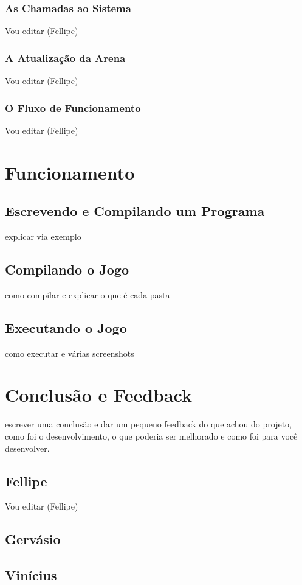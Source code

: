 \documentclass[a4paper]{article}
\begin{document}

\subsubsection{As Chamadas ao Sistema}
Vou editar (Fellipe)
\subsubsection{A Atualização da Arena}
Vou editar (Fellipe)
\subsubsection{O Fluxo de Funcionamento}
Vou editar (Fellipe)

\section{Funcionamento}
\subsection{Escrevendo e Compilando um Programa}
explicar via exemplo
\subsection{Compilando o Jogo}
como compilar e explicar o que é cada pasta
\subsection{Executando o Jogo}
como executar e várias screenshots

\section{Conclusão e Feedback}
escrever uma conclusão e dar um pequeno feedback do que achou do projeto, como foi o desenvolvimento, o que poderia ser melhorado e como foi para você desenvolver.
\subsection{Fellipe}
Vou editar (Fellipe)
\subsection{Gervásio}
\subsection{Vinícius}
\end{document}
